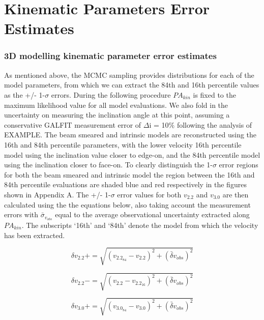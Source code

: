 \documentclass[fleqn,usenatbib]{mn2e}
\begin{document}
\section{Kinematic Parameters Error Estimates}\label{app:kin_error_estimates}

\subsubsection{3D modelling kinematic parameter error estimates}\label{subsubsec:model_errors}
As mentioned above, the MCMC sampling provides distributions for each of the model parameters, from which we can extract the 84th and 16th percentile values as the +/- 1-$\sigma$ errors.
During the following procedure $PA_{kin}$ is fixed to the maximum likelihood value for all model evaluations.
We also fold in the uncertainty on measuring the inclination angle at this point, assuming a conservative GALFIT measurement error of $\Delta$i = 10$\%$ following the analysis of EXAMPLE. 
The beam smeared and intrinsic models are reconstructed using the 16th and 84th percentile parameters, with the lower velocity 16th percentile model using the inclination value closer to edge-on, and the 84th percentile model using the inclination closer to face-on.
To clearly distinguish the 1-$\sigma$ error regions for both the beam smeared and intrinsic model the region between the 16th and 84th percentile evaluations are shaded blue and red respectively in the figures shown in Appendix A.
The +/- 1-$\sigma$ error values for both $v_{2.2}$ and $v_{3.0}$ are then calculated using the the equations below, also taking account the measurement errors with $\bar{\sigma}_{v_{obs}}$ equal to the average observational uncertainty extracted along $PA_{kin}$.
The subscripts `16th' and `84th' denote the model from which the velocity has been extracted.

\begin{equation}\label{eq:v2.2_plus}
   \delta v_{2.2}+ = \sqrt{(v_{2.2_{84}} - v_{2.2})^{2} + (\bar{\delta}v_{obs})^{2}}
\end{equation}

\begin{equation}\label{eq:v2.2_minus}
   \delta v_{2.2}- = \sqrt{(v_{2.2} - v_{2.2_{16}})^{2}  + (\bar{\delta}v_{obs})^{2}}
\end{equation}

\begin{equation}\label{eq:v3.0_plus}
   \delta v_{3.0}+ = \sqrt{(v_{3.0_{84}} - v_{3.0})^{2} + (\bar{\delta}v_{obs})^{2}}
\end{equation}
\end{document}
